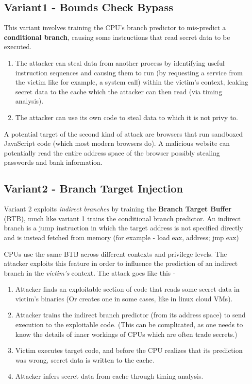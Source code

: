 \documentclass[12pt]{article}
\begin{document}
\subsection{Variant1 - Bounds Check Bypass}
This variant involves training the CPU's branch predictor to mis-predict a \textbf{conditional branch}, causing some instructions that read secret data to be executed. 
\begin{enumerate}
    \item The attacker can steal data from another process by identifying useful instruction sequences and causing them to run (by requesting a service from the victim like for example, a system call) within the victim's context, leaking secret data to the cache which the attacker can then read (via timing analysis). 
    \item The attacker can use its own code to steal data to which it is not privy to.
\end{enumerate}
 A potential target of the second kind of attack are browsers that run sandboxed JavaScript code (which most modern browsers do). A malicious website can potentially read the entire address space of the browser possibly stealing passwords and bank information.

\subsection{Variant2 - Branch Target Injection}
Variant 2 exploits \textit{indirect branches} by training the \textbf{Branch Target Buffer} (BTB), much like variant 1 trains the conditional branch predictor. An indirect branch is a jump instruction in which the target address is not specified directly and is instead fetched from memory (for example - load eax, address; jmp eax)

CPUs use the same BTB across different contexts and privilege levels. The attacker exploits this feature in order to influence the prediction of an indirect branch in the \textit{victim's} context. The attack goes like this - 
 \begin{enumerate}
 \item Attacker finds an exploitable section of code that reads some secret data in victim's binaries (Or creates one in some cases, like in linux cloud VMs).
 \item Attacker trains the indirect branch predictor (from its address space) to send execution to the exploitable code. (This can be complicated, as one needs to know the details of inner workings of CPUs which are often trade secrets.)
 \item Victim executes target code, and before the CPU realizes that its prediction was wrong, secret data is written to the cache.
 \item Attacker infers secret data from cache through timing analysis.
 \end{enumerate}
\end{document}
